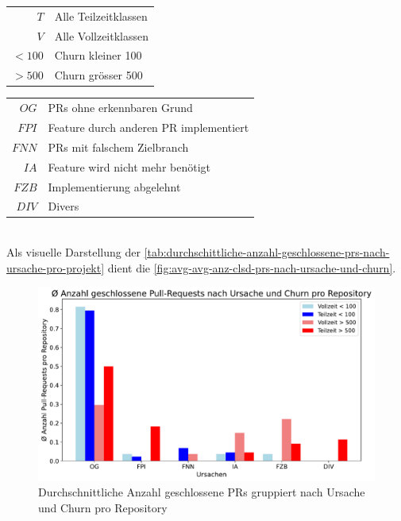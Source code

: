 \noindent
\begin{minipage}[t]{0.3\textwidth}
\begin{tabular}{r l}
$T$ & Alle Teilzeitklassen \\
$V$ & Alle Vollzeitklassen \\
$< 100$ & Churn kleiner 100 \\
$> 500$ & Churn grösser 500 \\
\end{tabular}
\end{minipage}
\hfill
\begin{minipage}[t]{0.6\textwidth}
\begin{tabular}{r l}
$OG$ & PRs ohne erkennbaren Grund \\
$FPI$ & Feature durch anderen PR im\-plementiert \\
$FNN$ & PRs mit falschem Zielbranch \\
$IA$ & Feature wird nicht mehr benötigt \\
$FZB$ & Implementierung abgelehnt  \\
$DIV$ & Divers \\
\end{tabular}
\end{minipage}
\\

Als visuelle Darstellung der \autoref{tab:durchschittliche-anzahl-geschlossene-prs-nach-ursache-pro-projekt} dient die \autoref{fig:avg-avg-anz-clsd-prs-nach-ursache-und-churn}.

\begin{figure}[htbp]
    \includegraphics[width=\textwidth]{Figures/ursachenanalyse-pro-repo.pdf}
    \caption{Durchschnittliche Anzahl geschlossene PRs gruppiert nach Ursache und Churn pro Repository}
    \label{fig:avg-avg-anz-clsd-prs-nach-ursache-und-churn}
\end{figure}

